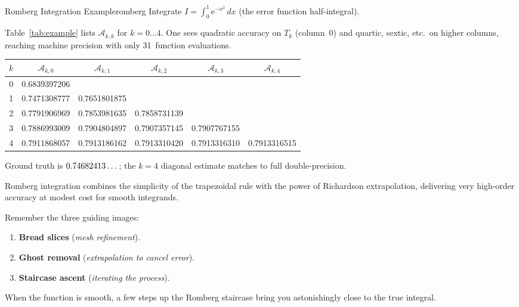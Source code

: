 \begin{example}{Romberg Integration Example}{romberg}
  Integrate \(I=\int_{0}^{1} \mathrm{e}^{-x^{2}}\,dx\) (the error function
  half-integral).

  \medskip

  Table~\ref{tab:example} lists $\mathcal{A}_{k,k}$ for $k=0\dots4$.
  One sees quadratic accuracy on $T_k$ (column~0) and quartic,
  sextic, etc.\ on higher columns, reaching machine precision with
  only 31~function evaluations.

  \medskip

  \begin{center}
    \begin{tabular}{c|ccccc}
      $k$ & $\mathcal{A}_{k,0}$ & $\mathcal{A}_{k,1}$ & $\mathcal{A}_{k,2}$ & $\mathcal{A}_{k,3}$ & $\mathcal{A}_{k,4}$ \\ \hline
      0   & 0.6839397206        &                     &                     &                     &                     \\
      1   & 0.7471308777        & 0.7651801875        &                     &                     &                     \\
      2   & 0.7791906969        & 0.7853981635        & 0.7858731139        &                     &                     \\
      3   & 0.7886993009        & 0.7904804897        & 0.7907357145        & 0.7907767155        &                     \\
      4   & 0.7911868057        & 0.7913186162        & 0.7913310420        & 0.7913316310        & 0.7913316515        \\
    \end{tabular}
    \label{tab:example}
  \end{center}

  Ground truth is \(0.74682413\mbox{\,…}\); the $k=4$ diagonal estimate matches to full double-precision.
\end{example}

Romberg integration combines the simplicity of the trapezoidal rule with the power of Richardson extrapolation, delivering very high-order accuracy at modest cost for smooth integrands.

Remember the three guiding images:
\begin{enumerate}
  \item \textbf{Bread slices} (\emph{mesh refinement}).
  \item \textbf{Ghost removal} (\emph{extrapolation to cancel error}).
  \item \textbf{Staircase ascent} (\emph{iterating the process}).
\end{enumerate}
When the function is smooth, a few steps up the Romberg staircase bring you astonishingly close to the
true integral.


